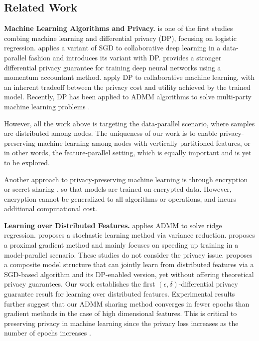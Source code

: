 \subsection{Related Work}
{\bf Machine Learning Algorithms and Privacy.} \cite{chaudhuri2009privacy}
is one of the first studies combing machine learning and differential privacy (DP), focusing on logistic regression. \cite{shokri2015privacy} applies a variant of SGD to collaborative deep learning in a data-parallel fashion and introduces its variant with DP. \cite{abadi2016deep} provides a stronger differential privacy guarantee for training deep neural networks using a momentum accountant method. \cite{pathak2010multiparty, rajkumar2012differentially} apply DP to collaborative machine learning, with an inherent tradeoff between the privacy cost and utility achieved by the trained model. Recently, DP has been applied to ADMM algorithms to solve multi-party machine learning problems \cite{zhang2018improving, zhang2016dual, zhang2019admm, zhang2017dynamic}. 

However, all the work above is targeting the data-parallel scenario, where samples are distributed among nodes. The uniqueness of our work is to enable privacy-preserving machine learning among nodes with vertically partitioned features, or in other words, the feature-parallel setting, which is equally important and is yet to be explored. 

Another approach to privacy-preserving machine learning is through
encryption \cite{gilad2016cryptonets,takabi2016privacy, kikuchi2018privacy} or secret sharing \cite{mohassel2017secureml, wan2007privacy, bonte2018privacy}, so that models are trained on encrypted data. However, encryption cannot be generalized to all algorithms or operations, and incurs additional computational cost.

{\bf Learning over Distributed Features.}
\cite{gratton2018distributed} applies ADMM to solve ridge regression.
\cite{ying2018supervised} proposes a stochastic learning method via variance reduction. \cite{zhou2016convergence} proposes a proximal gradient method and mainly focuses on speeding up training in a model-parallel scenario. These studies do not consider the privacy issue. \cite{hu2019fdml} proposes a composite model structure that can jointly learn from distributed features via a SGD-based algorithm and its DP-enabled version, yet without offering theoretical privacy guarantees. Our work establishes the first $(\epsilon,\delta)$-differential privacy guarantee result for learning over distributed features. Experimental results further suggest that our ADMM sharing method converges in fewer epochs than gradient methods in the case of high dimensional features. This is critical to preserving privacy in machine learning since the privacy loss increases as the number of epochs increases \cite{dwork2014algorithmic}.  %

